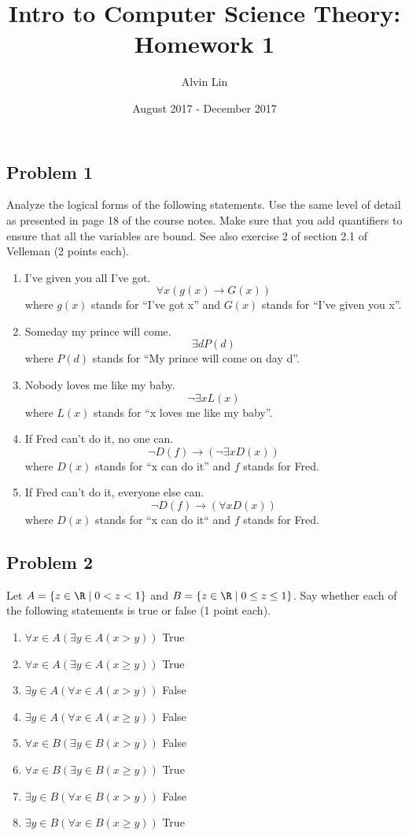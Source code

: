 \documentclass{math}
\title{Intro to Computer Science Theory: Homework 1}
\author{Alvin Lin}
\date{August 2017 - December 2017}
\begin{document}
\maketitle

\subsection*{Problem 1}
Analyze the logical forms of the following statements. Use the same level of
detail as presented in page 18 of the course notes. Make sure that you add
quantifiers to ensure that all the variables are bound. See also exercise 2 of
section 2.1 of Velleman (2 points each).
\begin{enumerate}
  \item I've given you all I've got.
    \[ \forall{x}(g(x)\to G(x)) \]
    where \( g(x) \) stands for ``I've got x'' and \( G(x) \) stands for ``I've
    given you x''.
  \item Someday my prince will come.
    \[ \exists{d}P(d) \]
    where \( P(d) \) stands for ``My prince will come on day d''.
  \item Nobody loves me like my baby.
    \[ \neg\exists{x}L(x) \]
    where \( L(x) \) stands for ``x loves me like my baby''.
  \item If Fred can't do it, no one can.
    \[ \neg D(f)\to(\neg\exists{x}D(x)) \]
    where \( D(x) \) stands for ``x can do it'' and \( f \) stands for Fred.
  \item If Fred can't do it, everyone else can.
    \[ \neg D(f)\to(\forall{x}D(x)) \]
    where \( D(x) \) stands for ``x can do it`` and \( f \) stands for Fred.
\end{enumerate}

\subsection*{Problem 2}
Let \( A = \{z\in\R \mid 0 < z < 1\} \) and \( B = \{z\in\R \mid 0 \le z \le
1\} \). Say whether each of the following statements is true or false (1 point
each).
\begin{enumerate}
  \item \( \forall{x}\in A(\exists{y}\in A(x > y)) \) True
  \item \( \forall{x}\in A(\exists{y}\in A(x \ge y)) \) True
  \item \( \exists{y}\in A(\forall{x}\in A(x > y)) \) False
  \item \( \exists{y}\in A(\forall{x}\in A(x \ge y)) \) False
  \item \( \forall{x}\in B(\exists{y}\in B(x > y)) \) False
  \item \( \forall{x}\in B(\exists{y}\in B(x \ge y)) \) True
  \item \( \exists{y}\in B(\forall{x}\in B(x > y)) \) False
  \item \( \exists{y}\in B(\forall{x}\in B(x \ge y)) \) True
\end{enumerate}
\end{document}
